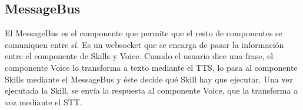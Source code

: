 \subsection{MessageBus}

El MessageBus es el componente que permite que el resto de componentes se comuniquen entre sí. Es un websocket que se encarga de pasar la información entre el componente de Skills y Voice. Cuando el usuario dice una frase, el componente Voice lo transforma a texto mediante el TTS, lo pasa al componente Skills mediante el MessageBus y éste decide qué Skill hay que ejecutar. Una vez ejecutada la Skill, se envía la respuesta al componente Voice, que la transforma a voz mediante el STT.


